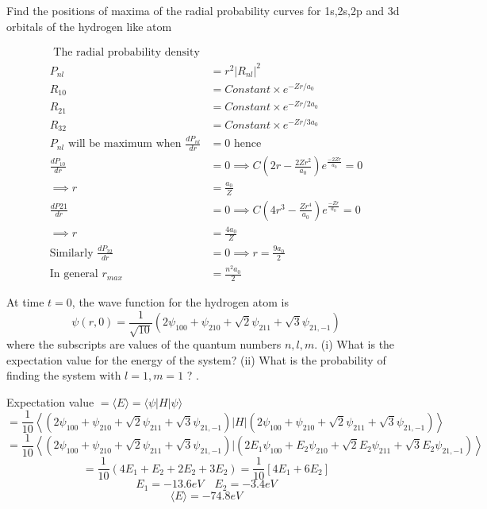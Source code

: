 \begin{exercise}
	Find the positions of maxima of the radial probability curves for 1s,2s,2p and 3d orbitals of the hydrogen like atom 
\end{exercise}
\begin{answer}
	\begin{align*}
\text{	The radial probability density}\\
P_{nl}&=r^2|R_{nl}|^2\\
R_{10}&=Constant \times e^{-Zr/a_0}\\
R_{21}&=Constant \times e^{-Zr/2a_0}\\
R_{32}&=Constant \times e^{-Zr/3a_0}\\
\text{$P_{nl}$ will be maximum when $\frac{dP_{nl}}{dr}$}&=\text{$0$ hence }\\
\frac{dP_{10}}{dr}&=0 \implies C(2r-\frac{2Zr^2}{a_0})e^{\frac{-2Zr}{a_0}}=0\\
\implies r&=\frac{a_0}{Z}\\
\frac{dP{21}}{dr}&=0\implies C(4r^3-\frac{Zr^4}{a_0})e^{\frac{-Zr}{a_0}}=0\\
\implies r&=\frac{4a_0}{Z}\\
\text{Similarly }\frac{dP_{32}}{dr}&=0\implies r=\frac{9a_0}{2}\\
\text{In general }r_{max}&=\frac{n^2a_0}{2}
	\end{align*}
\end{answer}
\begin{exercise}
	 At time $t=0$, the wave function for the hydrogen atom is
	$$
	\psi(r, 0)=\frac{1}{\sqrt{10}}\left(2 \psi_{100}+\psi_{210}+\sqrt{2} \psi_{211}+\sqrt{3} \psi_{21,-1}\right)
	$$
	where the subscripts are values of the quantum numbers $n, l, m$. (i) What is the expectation value for the energy of the system? (ii) What is the probability of finding the system with $l=1, m=1$ ? .
\end{exercise}
\begin{answer}
	Expectation value $=\langle E \rangle =\langle \psi |H|\psi\rangle$\\
$$=\frac{1}{10}\left\langle \left(2 \psi_{100}+\psi_{210}+\sqrt{2} \psi_{211}+\sqrt{3} \psi_{21,-1}\right)|H|\left(2 \psi_{100}+\psi_{210}+\sqrt{2} \psi_{211}+\sqrt{3} \psi_{21,-1}\right)\right\rangle $$
$$=\frac{1}{10}\left\langle \left(2 \psi_{100}+\psi_{210}+\sqrt{2} \psi_{211}+\sqrt{3} \psi_{21,-1}\right)|\left(2E_1 \psi_{100}+E_2\psi_{210}+\sqrt{2} E_2\psi_{211}+\sqrt{3}E_2 \psi_{21,-1}\right)\right\rangle $$
$$=\frac{1}{10}\left( 4E_1+E_2+2E_2+3E_2\right) =\frac{1}{10}\left[ 4E_1+6E_2\right] $$
$$E_1=-13.6eV \quad E_2=-3.4eV$$
$$\langle E \rangle=-74.8eV$$
\end{answer}



